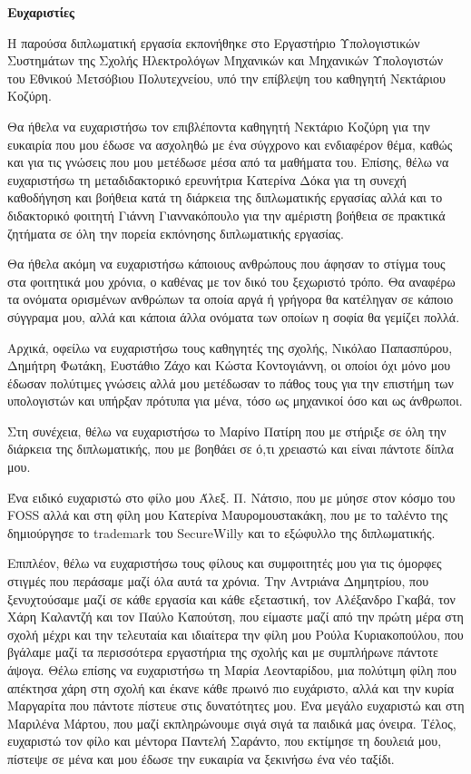 \thispagestyle{empty}
\gr{}
\begingroup
 
\begin{mdseries}
\hfill\break 
\textbf{\Large Ευχαριστίες}
\hfill\break

Η παρούσα διπλωματική εργασία εκπονήθηκε στο Εργαστήριο Υπολογιστικών Συστημάτων της Σχολής Ηλεκτρολόγων Μηχανικών και Μηχανικών Υπολογιστών του Εθνικού Μετσόβιου Πολυτεχνείου, υπό την επίβλεψη του καθηγητή Νεκτάριου Κοζύρη.

Θα ήθελα να ευχαριστήσω τον επιβλέποντα καθηγητή Νεκτάριο Κοζύρη για την ευκαιρία που μου έδωσε να ασχοληθώ με ένα σύγχρονο και ενδιαφέρον θέμα, καθώς και για τις γνώσεις που μου μετέδωσε μέσα από τα μαθήματα του. Επίσης, θέλω να ευχαριστήσω τη μεταδιδακτορικό ερευνήτρια Κατερίνα Δόκα για τη συνεχή καθοδήγηση και βοήθεια κατά τη διάρκεια της διπλωματικής εργασίας αλλά και το διδακτορικό φοιτητή Γιάννη Γιαννακόπουλο για την αμέριστη βοήθεια σε πρακτικά ζητήματα σε όλη την πορεία εκπόνησης διπλωματικής εργασίας.

Θα ήθελα ακόμη να ευχαριστήσω κάποιους ανθρώπους που άφησαν το στίγμα τους στα φοιτητικά μου χρόνια, ο καθένας με τον δικό του ξεχωριστό τρόπο. Θα αναφέρω τα ονόματα ορισμένων ανθρώπων τα οποία αργά ή γρήγορα θα κατέληγαν σε κάποιο σύγγραμα μου, αλλά και κάποια άλλα ονόματα των οποίων η σοφία θα γεμίζει πολλά.

Αρχικά, οφείλω να ευχαριστήσω τους καθηγητές της σχολής, Νικόλαο Παπασπύρου, Δημήτρη Φωτάκη, Ευστάθιο Ζάχο και Κώστα Κοντογιάννη, οι οποίοι όχι μόνο μου έδωσαν πολύτιμες γνώσεις αλλά μου μετέδωσαν το πάθος τους για την επιστήμη των υπολογιστών και υπήρξαν πρότυπα για μένα, τόσο ως μηχανικοί όσο και ως άνθρωποι.

Στη συνέχεια, θέλω να ευχαριστήσω το Μαρίνο Πατίρη που με στήριξε σε όλη την διάρκεια της διπλωματικής, που με βοηθάει σε ό,τι χρειαστώ και είναι πάντοτε δίπλα μου.

Ένα ειδικό ευχαριστώ στο φίλο μου Άλεξ. Π. Νάτσιο, που με μύησε στον κόσμο του \en FOSS\gr{} αλλά και στη φίλη μου Κατερίνα Μαυρομουστακάκη, που με το ταλέντο της δημιούργησε το \en trademark\gr{} του \en SecureWilly\gr{} και το εξώφυλλο της διπλωματικής.

Επιπλέον, θέλω να ευχαριστήσω τους φίλους και συμφοιτητές μου για τις όμορφες στιγμές που περάσαμε μαζί όλα αυτά τα χρόνια. Την Αντριάνα Δημητρίου, που ξενυχτούσαμε μαζί σε κάθε εργασία και κάθε εξεταστική, τον Αλέξανδρο Γκαβά, τον Χάρη Καλαντζή και τον Παύλο Καπούτση, που είμαστε μαζί από την πρώτη μέρα στη σχολή μέχρι και την τελευταία και ιδιαίτερα την φίλη μου Ρούλα Κυριακοπούλου, που βγάλαμε μαζί τα περισσότερα εργαστήρια της σχολής και με συμπλήρωνε πάντοτε άψογα. Θέλω επίσης να ευχαριστήσω τη Μαρία Λεονταρίδου, μια πολύτιμη φίλη που απέκτησα χάρη στη σχολή και έκανε κάθε πρωινό πιο ευχάριστο, αλλά και την κυρία Μαργαρίτα που πάντοτε πίστευε στις δυνατότητες μου. Ένα μεγάλο ευχαριστώ και στη Μαριλένα Μάρτου, που μαζί εκπληρώνουμε σιγά σιγά τα παιδικά μας όνειρα. Τέλος, ευχαριστώ τον φίλο και μέντορα Παντελή Σαράντο, που εκτίμησε τη δουλειά μου, πίστεψε σε μένα και μου έδωσε την ευκαιρία να ξεκινήσω ένα νέο ταξίδι.


\end{mdseries}
